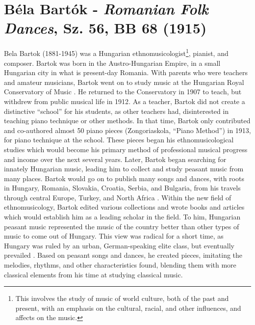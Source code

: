 \chapter[Bartok and \textit{Romanian Folk Dances}, Sz. 56, BB 68]{Béla Bartók - \textit{Romanian Folk Dances}, Sz. 56, BB 68 (1915)}

Bela Bartok (1881-1945) was a Hungarian ethnomusicologist\footnote{This involves the study of music of world culture, both of the past and present, with an emphasis on the cultural, racial, and other influences, and affects on the music.}, pianist, and composer. Bartok was born in the Austro-Hungarian Empire, in a small Hungarian city in what is present-day Romania. With parents who were teachers and amateur musicians, Bartok went on to study music at the Hungarian Royal Conservatory of Music \autocite{Burkholder_Grout_Palisca_2014}. He returned to the Conservatory in 1907 to teach, but withdrew from public musical life in 1912\autocite{Gillies}. As a teacher, Bartok did not create a distinctive ``school'' for his students, as other teachers had, disinterested in teaching piano technique or other methods. In that time, Bartok only contributed and co-authored almost 50 piano pieces (Zongoriaskola, ``Piano Method'') in 1913, for piano technique at the school\autocite{Gillies}. These pieces began his ethnomusicological studies which would become his primary method of professional musical progress and income over the next several years. Later, Bartok began searching for innately Hungarian music, leading him to collect and study peasant music from many places. Bartok would go on to publish many songs and dances, with roots in Hungary, Romania, Slovakia, Croatia, Serbia, and Bulgaria, from his travels through central Europe, Turkey, and North Africa \autocite{Burkholder_Grout_Palisca_2014}. Within the new field of ethnomusicology, Bartok edited various collections and wrote books and articles which would establish him as a leading scholar in the field. To him, Hungarian peasant music represented the music of the country better than other types of music to come out of Hungary. This view was radical for a short time, as Hungary was ruled by an urban, German-speaking elite class, but eventually prevailed \autocite{Burkholder_Grout_Palisca_2014}. Based on peasant songs and dances, he created pieces, imitating the melodies, rhythms, and other characteristics found, blending them with more classical elements from his time at studying classical music. 

